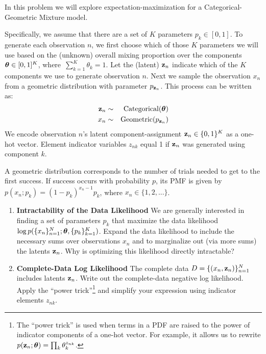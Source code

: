 \documentclass[submit]{harvardml}
\begin{document}
\begin{problem}

In this problem we will explore expectation-maximization for a
Categorical-Geometric Mixture model.

Specifically, we assume that there are a set of $K$ parameters $p_k
\in [0,1]$.  To generate each observation $n$, we first choose which
of those $K$ parameters we will use based on the (unknown) overall
mixing proportion over the components $\boldsymbol{\theta} \in [0,1]^K$,
where~${\sum_{k=1}^K \theta_k=1}$.  Let the (latent) $\mathbf{z}_n$ indicate
which of the $K$ components we use to generate observation $n$.  Next
we sample the observation $x_n$ from a geometric distribution
with parameter $p_{\mathbf{z}_n}$.  This process can be written as: 
\begin{eqnarray*}
 \mathbf{z}_n &\sim& \text{Categorical}(\boldsymbol{\theta}) \\
 x_n &\sim& \text{Geometric}(p_{\mathbf{z}_n} )
\end{eqnarray*}
We encode observation $n$'s latent
component-assignment ${\mathbf{z}_n \in
  \{0,1\}^K}$ as a one-hot vector. Element indicator variables $z_{n k}$ equal 1 if $\mathbf{z}_n$ was generated using component $k$.

A geometric distribution corresponds to the number of trials
needed to get to the first success. If success occurs with probability
$p$, its PMF is given by $p(x_n ; p_k) = (1 - p_k)^{x_n - 1} p_k$, where $x_n \in \{1, 2, ...\}$.

  \begin{enumerate}

  \item \textbf{Intractability of the Data Likelihood} We are
    generally interested in finding a set of parameters $p_k$ that
    maximize the data likelihood $\log
    p(\{x_n\}^N_{n=1}; \boldsymbol{\theta}, \{p_k\}^K_{k = 1})$.  Expand the data
    likelihood to include the necessary sums over observations
    $x_n$ and to marginalize out (via more sums) the latents
    $\mathbf{z}_n$.  Why is optimizing this likelihood directly
    intractable?  

\item \textbf{Complete-Data Log Likelihood} The complete data
  $D = \{(x_n, \mathbf{z}_n)\}_{n=1}^N$ includes latents $\mathbf{z}_n$. Write
  out the complete-data negative log likelihood. Apply the ``power trick''\footnote{The ``power trick'' is used when terms in a PDF are raised to the power of indicator components of a one-hot vector.  For example, it allows us to rewrite $p(\mathbf{z}_n ;  \boldsymbol{\theta}) = \prod_k \theta_k^{z_{nk}}$.} and simplify your expression using indicator elements $z_{n k}$.


\end{enumerate}
\end{problem}
\end{document}
